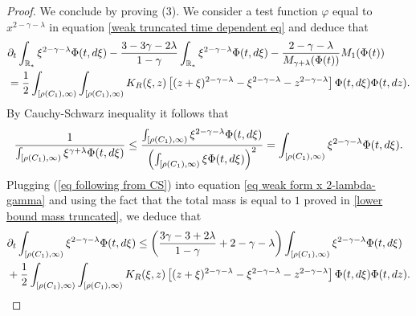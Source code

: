 \documentclass[11pt]{article}
\numberwithin{equation}{section}
\theoremstyle{plain}
\newcommand{\der}{\textup{d}}
\begin{document}
\begin{proof}
We conclude by proving (3). 
We consider a test function $\varphi $ equal to $x^{2-\gamma - \lambda} $ in equation \eqref{weak truncated time dependent eq} and deduce that
\begin{align} \label{eq weak form x 2-lambda-gamma} 
&\partial_t \int_{\mathbb{R}_{\ast}} \xi^{2-\gamma - \lambda }\Phi(t,\der \xi) - \frac{3-3\gamma- 2 \lambda}{1-\gamma}\int_{\mathbb{R}_{\ast}}\xi^{2-\gamma - \lambda }\Phi(t,\der \xi) 
- \frac{ 2-\gamma -\lambda }{M_{\gamma+\lambda}(\Phi(t)) } M_{1}(\Phi(t))  \\
&= \frac{1}{2}\int_{[ \rho(C_1), \infty)}\int_{[ \rho(C_1), \infty)} K_R(\xi,z) \left[(z+\xi)^{2-\gamma -\lambda }- \xi^{2-\gamma -\lambda}-z^{2-\gamma -\lambda} \right] \Phi(t,\der \xi)\Phi(t,\der z).\nonumber 
\end{align} 
By Cauchy-Schwarz inequality it follows that
\begin{equation}\label{eq following from CS}
\frac{1}{\int_{[ \rho(C_1), \infty)} \xi^{\gamma +\lambda} \Phi(t,\der \xi)} \leq 
\frac{\int_{[ \rho(C_1), \infty)}\xi^{2-\gamma - \lambda } \Phi(t,\der \xi)}{ \left( \int_{[ \rho(C_1), \infty)}\xi \Phi(t,\der \xi) \right)^2} = \int_{[ \rho(C_1), \infty)} \xi^{2-\gamma - \lambda } \Phi(t,\der \xi). 
\end{equation}
Plugging (\ref{eq following from CS}) into equation \eqref{eq weak form x 2-lambda-gamma} and using the fact that the total mass is equal to $1$ proved in \eqref{lower bound mass truncated}, we deduce that
\begin{align*}
&\partial_t \int_{[ \rho(C_1), \infty)} \xi^{2-\gamma - \lambda }\Phi(t,\der \xi) \leq \left( \frac{3\gamma-3+2\lambda}{1-\gamma} + 2-\gamma -\lambda\right) \int_{[ \rho(C_1), \infty)} \xi^{2-\gamma - \lambda }\Phi(t,\der \xi) \\
&+ \frac{1}{2}\int_{[ \rho(C_1), \infty)} \int_{[ \rho(C_1), \infty)}K_R(\xi,z) \left[(z+\xi)^{2-\gamma -\lambda }- \xi^{2-\gamma -\lambda}-z^{2-\gamma -\lambda} \right] \Phi(t,\der \xi)\Phi(t,\der z).
\end{align*} 


\end{proof}
\end{document}
